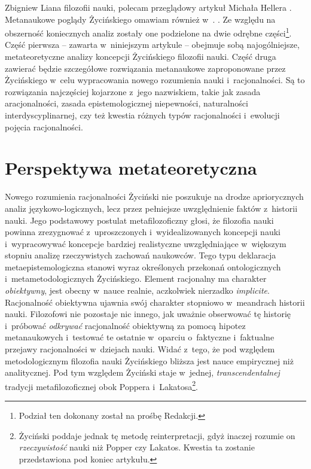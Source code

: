 \begin{artplenv}{Zbigniew Liana}
{filozofii nauki, polecam przeglądowy artykuł Michała Hellera
\parencite*{heller_filozoficzny_2011}.
Metanaukowe poglądy Życińskiego omawiam również w~\parencite{evers_can_2016}.
}. Ze względu na obszerność koniecznych analiz zostały one podzielone na dwie odrębne części\footnote{\label{lia-foo-5}Podział ten
dokonany został na prośbę Redakcji.}. Część pierwsza -- zawarta w~niniejszym artykule -- obejmuje sobą najogólniejsze,
metateoretyczne analizy koncepcji Życińskiego filozofii nauki. Część druga zawierać będzie szczegółowe rozwiązania
metanaukowe zaproponowane przez Życińskiego w~celu wypracowania nowego rozumienia nauki i~racjonalności. Są to
rozwiązania najczęściej kojarzone z~jego nazwiskiem, takie jak zasada aracjonalności, zasada epistemologicznej
niepewności, naturalności interdyscyplinarnej, czy też kwestia różnych typów racjonalności i~ewolucji pojęcia
racjonalności.

\section{Perspektywa metateoretyczna}

Nowego rozumienia racjonalności Życiński nie poszukuje na drodze apriorycznych analiz językowo-logicznych, lecz przez
pełniejsze uwzględnienie faktów z~historii nauki. Jego podstawowy postulat metafilozoficzny głosi, że filozofia nauki
powinna zrezygnować z~uproszczonych i~wyidealizowanych koncepcji nauki i~wypracowywać koncepcje bardziej realistyczne
uwzględniające w~większym stopniu analizę rzeczywistych zachowań naukowców. Tego typu deklaracja metaepistemologiczna
stanowi wyraz określonych przekonań ontologicznych i~metametodologicznych Życińskiego. Element racjonalny ma charakter
\textit{obiektywny}, jest obecny w~nauce realnie, aczkolwiek nierzadko \textit{implicite}. Racjonalność obiektywna ujawnia
swój charakter stopniowo w~meandrach historii nauki. Filozofowi nie pozostaje nic innego, jak uważnie obserwować tę
historię i~próbować \textit{odkrywać }racjonalność obiektywną za pomocą hipotez metanaukowych i~testować te
ostatnie w~oparciu o~faktyczne i~faktualne przejawy racjonalności w~dziejach nauki. Widać z~tego, że pod względem metodologicznym
filozofia nauki Życińskiego bliższa jest nauce empirycznej niż analitycznej. Pod tym względem Życiński staje w~jednej,
\textit{transcendentalnej} tradycji metafilozoficznej obok Poppera i~Lakatosa\footnote{Życiński poddaje jednak tę metodę
reinterpretacji, gdyż inaczej rozumie on \textit{rzeczywistość} nauki niż Popper czy Lakatos. Kwestia ta zostanie
przedstawiona pod koniec artykułu.}.


\end{artplenv}
